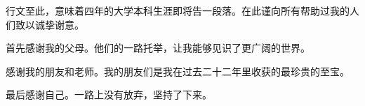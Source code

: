 
\begin{thankscontent}
行文至此，意味着四年的大学本科生涯即将告一段落。在此谨向所有帮助过我的人们致以诚挚谢意。

首先感谢我的父母。他们的一路托举，让我能够见识了更广阔的世界。

感谢我的朋友和老师。我的朋友们是我在过去二十二年里收获的最珍贵的至宝。

最后感谢自己。一路上没有放弃，坚持了下来。
\end{thankscontent}